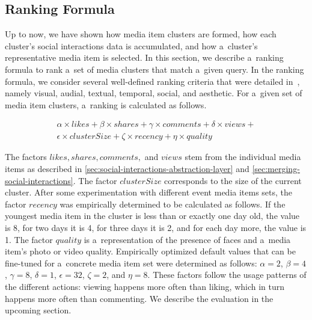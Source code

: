 \subsection{Ranking Formula}
\label{sec:introduction-of-a-ranking-formula}

Up to now, we have shown how media item clusters are formed,
how each cluster's social interactions data is accumulated,
and how a~cluster's representative media item is selected.
In this section, we describe a~ranking formula to rank
a~set of media clusters that match a~given query.
In the ranking formula, we consider several well-defined ranking criteria
that were detailed in~\cite{steiner2012definingaesthetic},
namely visual, audial, textual, temporal, social, and aesthetic.
For a~given set of media item clusters, a~ranking is calculated as follows.

\begin{gather}\label{eq:rankingformula}
  \alpha \times \mathit{likes} + \beta \times \mathit{shares} +
  \gamma \times \mathit{comments} + \delta \times \mathit{views} + \nonumber\\
  \epsilon \times \mathit{clusterSize} + \zeta \times \mathit{recency} +
  \eta \times \mathit{quality}
\end{gather}

The factors $ \mathit{likes}, \mathit{shares}, \mathit{comments},$ and $ \mathit{views} $
stem from the individual media items as described in \autoref{sec:social-interactions-abstraction-layer}
and \autoref{sec:merging-social-interactions}.
The factor $ \mathit{clusterSize} $ corresponds to the size of the current cluster. 
After some experimentation with different event media items sets,
the factor $ \mathit{recency} $ was empirically determined to be calculated as follows.
If the youngest media item in the cluster is less than or exactly one day old,
the value is 8, for two days it is 4, for three days it is 2,
and for each day more, the value is 1.
The factor $ \mathit{quality} $ is a~representation of the
presence of faces and a~media item's photo or video quality.
Empirically optimized default values
that can be fine-tuned for a~concrete media item set
were determined as follows:
$ \alpha = 2 $, $ \beta = 4 $ , $ \gamma = 8 $, $ \delta = 1 $,
$ \epsilon = 32 $, $ \zeta = 2 $, and $ \eta = 8 $.
These factors follow the usage patterns of the different actions:
viewing happens more often than liking, which in turn happens more often than commenting.
We describe the evaluation in the upcoming section.

